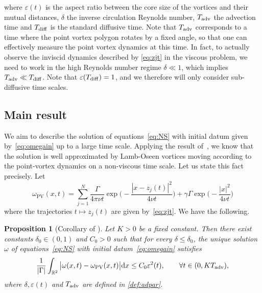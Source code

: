 \documentclass[11pt,reqno,a4paper]{amsart}
\def\dd{{\rm d}}
\def\eps{\varepsilon}
\def\R {\mathbb{R}} %
\newcommand{\1}{\mathbbm{1}}
\newtheorem{proposition}{Proposition}[section]
\theoremstyle{definition}
\theoremstyle{definition}
\numberwithin{equation}{section}
\begin{document}
where $\eps(t)$ is the aspect ratio between the core size of the vortices and their mutual distances, $\delta$ the inverse circulation Reynolds number, $T_{\rm adv}$ the advection time  and $T_{\rm diff}$ is the standard diffusive time. Note that $T_{\rm adv}$ corresponds to a time where the point vortex polygon rotates by a fixed angle, so that one can effectively measure the point vortex dynamics at this time. In fact, to actually observe the inviscid dynamics described by \cref{eq:zjt} in the viscous problem, we need to work in the high Reynolds number regime $\delta\ll 1$, which implies $T_{\rm adv}\ll T_{\rm diff}$. Note that $\eps(T_{\rm diff})=1$, and we therefore will only consider sub-diffusive time scales.

\subsection{Main result}
We aim to describe the solution of equations~\cref{eq:NS} with initial datum given by~\cref{eq:omegain} up to a large time scale. 
Applying the result of~\cite{Gallay2011}, we know that the solution is well approximated by Lamb-Oseen vortices moving according to the point-vortex dynamics on a non-viscous time scale. Let us state this fact precisely. Let
\begin{equation}
    \omega_{\mathrm{PV}}(x,t) = \sum_{j=1}^N \frac{\Gamma}{4\pi\nu t} \exp\Big(-\frac{|x-z_j(t)|^2}{4\nu t}\Big) + \gamma\Gamma \exp\Big(-\frac{|x|^2}{4\nu t}\Big)
\end{equation}
where the trajectories $t \mapsto z_j(t)$ are given by~\eqref{eq:zjt}.
We have the following.
\begin{proposition}[Corollary of {\cite[Theorem 2.4]{Gallay2011}}]\label{prop:gallay1}
    Let $K > 0$ be a fixed constant. Then there exist  constants $\delta_0 \in(0,1)$ and  $C_0>0$ such that for every $\delta \le \delta_0$, the unique solution $\omega$ of equations~\cref{eq:NS} with initial datum~\cref{eq:omegain} satisfies
    \begin{equation}
        \frac{1}{|\Gamma|}\int_{\R^2} \big|\omega(x,t) - \omega_{\mathrm{PV}}(x,t)\big| \dd x \le C_0 \eps^2(t), \qquad \forall t \in (0,KT_{\rm adv}),
    \end{equation}
    where $\delta,\eps(t)$ and $T_{\rm adv}$ are defined in \cref{def:adpar}.
\end{proposition}
\end{document}
